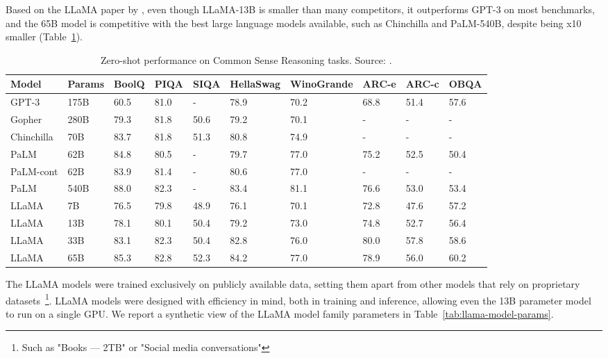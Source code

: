 Based on the LLaMA paper by \textcite{touvron2023llama}, even though LLaMA-13B is smaller than many competitors, it outperforms GPT-3 on most benchmarks, and the 65B model is competitive with the best large language models available, such as Chinchilla and PaLM-540B, despite being x10 smaller (Table~\ref{tab:llama-zero-shot-performance}).

\begin{table}[htbp]
	\centering
	\scriptsize
	\begin{tabularx}{\textwidth}{@{}lXXXXXXXXX@{}}
		\toprule
		Model      & Params & BoolQ & PIQA & SIQA & HellaSwag & WinoGrande & ARC-e & ARC-c & OBQA \\
		\midrule
		GPT-3      & 175B   & 60.5  & 81.0 & -    & 78.9      & 70.2       & 68.8  & 51.4  & 57.6 \\
		Gopher     & 280B   & 79.3  & 81.8 & 50.6 & 79.2      & 70.1       & -     & -     & -    \\
		Chinchilla & 70B    & 83.7  & 81.8 & 51.3 & 80.8      & 74.9       & -     & -     & -    \\
		PaLM       & 62B    & 84.8  & 80.5 & -    & 79.7      & 77.0       & 75.2  & 52.5  & 50.4 \\
		PaLM-cont  & 62B    & 83.9  & 81.4 & -    & 80.6      & 77.0       & -     & -     & -    \\
		PaLM       & 540B   & 88.0  & 82.3 & -    & 83.4      & 81.1       & 76.6  & 53.0  & 53.4 \\
		\addlinespace
		LLaMA      & 7B     & 76.5  & 79.8 & 48.9 & 76.1      & 70.1       & 72.8  & 47.6  & 57.2 \\
		LLaMA      & 13B    & 78.1  & 80.1 & 50.4 & 79.2      & 73.0       & 74.8  & 52.7  & 56.4 \\
		LLaMA      & 33B    & 83.1  & 82.3 & 50.4 & 82.8      & 76.0       & 80.0  & 57.8  & 58.6 \\
		LLaMA      & 65B    & 85.3  & 82.8 & 52.3 & 84.2      & 77.0       & 78.9  & 56.0  & 60.2 \\
		\bottomrule
	\end{tabularx}
	\caption{Zero-shot performance on Common Sense Reasoning tasks. Source: \protect\textcite{touvron2023llama}.}
	\label{tab:llama-zero-shot-performance}
\end{table}

The LLaMA models were trained exclusively on publicly available data, setting them apart from other models that rely on proprietary datasets~\footnote{Such as "Books --- 2TB" or "Social media conversations"}.
LLaMA models were designed with efficiency in mind, both in training and inference, allowing even the 13B parameter model to run on a single GPU\@.
We report a synthetic view of the LLaMA model family parameters in Table~\ref{tab:llama-model-params}.

